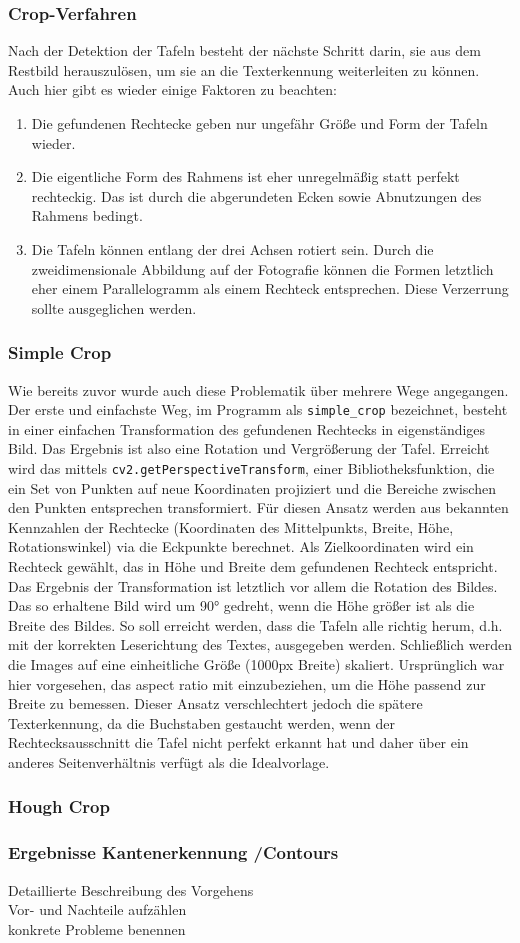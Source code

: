 \subsubsection{Crop-Verfahren}

Nach der Detektion der Tafeln besteht der nächste Schritt darin, sie aus dem Restbild herauszulösen, um sie an die Texterkennung weiterleiten zu können. Auch hier gibt es wieder einige Faktoren zu beachten:
\begin{enumerate}
\item Die gefundenen Rechtecke geben nur ungefähr Größe und Form der Tafeln wieder.
\item Die eigentliche Form des Rahmens ist eher unregelmäßig statt perfekt rechteckig. Das ist durch die abgerundeten Ecken sowie Abnutzungen des Rahmens bedingt.
\item Die Tafeln können entlang der drei Achsen rotiert sein. Durch die zweidimensionale Abbildung auf der Fotografie können die Formen letztlich eher einem Parallelogramm als einem Rechteck entsprechen. Diese Verzerrung sollte ausgeglichen werden.
\end{enumerate}

\subsubsection*{Simple Crop}

Wie bereits zuvor wurde auch diese Problematik über mehrere Wege angegangen. Der erste und einfachste Weg, im Programm als \verb|simple_crop| bezeichnet, besteht in einer einfachen Transformation des gefundenen Rechtecks in eigenständiges Bild. Das Ergebnis ist also eine Rotation und Vergrößerung der Tafel. Erreicht wird das mittels \verb|cv2.getPerspectiveTransform|, einer Bibliotheksfunktion, die ein Set von Punkten auf neue Koordinaten projiziert und die Bereiche zwischen den Punkten entsprechen transformiert. Für diesen Ansatz werden aus bekannten Kennzahlen der Rechtecke (Koordinaten des Mittelpunkts, Breite, Höhe, Rotationswinkel) via die Eckpunkte berechnet. Als Zielkoordinaten wird ein Rechteck gewählt, das in Höhe und Breite dem gefundenen Rechteck entspricht. Das Ergebnis der Transformation ist letztlich vor allem die Rotation des Bildes.
Das so erhaltene Bild wird um 90° gedreht, wenn die Höhe größer ist als die Breite des Bildes. So soll erreicht werden, dass die Tafeln alle richtig herum, d.h. mit der korrekten Leserichtung des Textes, ausgegeben werden.
Schließlich werden die Images auf eine einheitliche Größe (1000px Breite) skaliert. Ursprünglich war hier vorgesehen, das aspect ratio mit einzubeziehen, um die Höhe passend zur Breite zu bemessen. Dieser Ansatz verschlechtert jedoch die spätere Texterkennung, da die Buchstaben gestaucht werden, wenn der Rechtecksausschnitt die Tafel nicht perfekt erkannt hat und daher über ein anderes Seitenverhältnis verfügt als die Idealvorlage.

\subsubsection*{Hough Crop}

\subsubsection{Ergebnisse Kantenerkennung /Contours}
Detaillierte Beschreibung des Vorgehens\\
Vor- und Nachteile aufzählen\\
konkrete Probleme benennen\\
